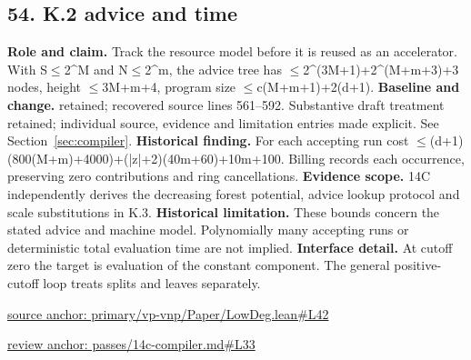 \documentclass[11pt,letterpaper]{article}
\theoremstyle{definition}\newtheorem{definition}[theorem]{Definition}\newtheorem{example}[theorem]{Example}
\theoremstyle{remark}\newtheorem{remark}[theorem]{Remark}
\begin{document}
\subsection*{54. K.2 advice and time}
\textbf{Role and claim.} Track the resource model before it is reused as an accelerator. With S\ensuremath{\le}2\textasciicircum{}M and N\ensuremath{\le}2\textasciicircum{}m, the advice tree has \ensuremath{\le}2\textasciicircum{}(3M+1)+2\textasciicircum{}(M+m+3)+3 nodes, height \ensuremath{\le}3M+m+4, program size \ensuremath{\le}c(M+m+1)+2(d+1).
\textbf{Baseline and change.} retained; recovered source lines 561--592. Substantive draft treatment retained; individual source, evidence and limitation entries made explicit. See Section~\ref{sec:compiler}.
\textbf{Historical finding.} For each accepting run cost \ensuremath{\le}(d+1)(800(M+m)+4000)+(|z|+2)(40m+60)+10m+100. Billing records each occurrence, preserving zero contributions and ring cancellations.
\textbf{Evidence scope.} 14C independently derives the decreasing forest potential, advice lookup protocol and scale substitutions in K.3.
\textbf{Historical limitation.} These bounds concern the stated advice and machine model. Polynomially many accepting runs or deterministic total evaluation time are not implied.
\textbf{Interface detail.} At cutoff zero the target is evaluation of the constant component. The general positive-cutoff loop treats splits and leaves separately.
\par\href{https://github.com/nousentllc/VP-VNP-Review/blob/8a7976933b6b2b4ffda1ad3a0dfb5fc6b6f023e8/primary/vp-vnp/Paper/LowDeg.lean\#L42}{source anchor: primary/vp-vnp/Paper/LowDeg.lean\#L42}
\par\href{https://github.com/nousentllc/VP-VNP-Review/blob/8a7976933b6b2b4ffda1ad3a0dfb5fc6b6f023e8/passes/14c-compiler.md\#L33}{review anchor: passes/14c-compiler.md\#L33}
\goodbreak
\end{document}
